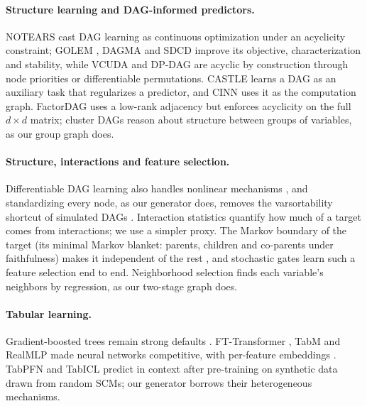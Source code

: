 \documentclass[anon,12pt]{clear2027} %
\begin{document}
\paragraph{Structure learning and DAG-informed predictors.}
NOTEARS \citep{zheng2018dags} cast DAG learning as continuous optimization under an acyclicity constraint; GOLEM \citep{ng2020role}, DAGMA \citep{bello2022dagma} and SDCD \citep{nazaret2024stable} improve its objective, characterization and stability, while VCUDA \citep{hoang2024vcuda} and DP-DAG \citep{charpentier2022differentiable} are acyclic by construction through node priorities or differentiable permutations. CASTLE \citep{kyono2020castle} learns a DAG as an auxiliary task that regularizes a predictor, and CINN \citep{zhang2024cinn} uses it as the computation graph. FactorDAG \citep{lopez2022large} uses a low-rank adjacency but enforces acyclicity on the full $d\times d$ matrix; cluster DAGs \citep{anand2023cluster} reason about structure between groups of variables, as our group graph does.

\paragraph{Structure, interactions and feature selection.}
Differentiable DAG learning also handles nonlinear mechanisms \citep{lachapelle2020gradient,zheng2020learning}, and standardizing every node, as our generator does, removes the varsortability shortcut of simulated DAGs \citep{reisach2021beware}. Interaction statistics \citep{lou2013accurate,friedman2008predictive} quantify how much of a target comes from interactions; we use a simpler proxy. The Markov boundary of the target (its minimal Markov blanket: parents, children and co-parents under faithfulness) makes it independent of the rest \citep{tsamardinos2003towards,aliferis2010local}, and stochastic gates \citep{yamada2020feature} learn such a feature selection end to end. Neighborhood selection \citep{meinshausen2006high} finds each variable's neighbors by regression, as our two-stage graph does.

\paragraph{Tabular learning.}
Gradient-boosted trees remain strong defaults \citep{friedman2001greedy,chen2016xgboost,ke2017lightgbm,prokhorenkova2018catboost}. FT-Transformer \citep{gorishniy2021revisiting}, TabM \citep{gorishniy2024tabm} and RealMLP \citep{holzmuller2024better} made neural networks competitive, with per-feature embeddings \citep{gorishniy2022embeddings,agarwal2021nam}. TabPFN \citep{hollmann2023tabpfn} and TabICL \citep{qu2025tabicl} predict in context after pre-training on synthetic data drawn from random SCMs; our generator borrows their heterogeneous mechanisms.
\end{document}
